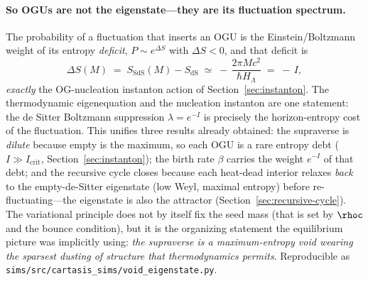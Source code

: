 \paragraph{So OGUs are not the eigenstate---they are its fluctuation spectrum.}
The probability of a fluctuation that inserts an OGU is the Einstein/Boltzmann weight
of its entropy \emph{deficit}, $P\sim e^{\Delta S}$ with $\Delta S<0$, and that deficit
is
\begin{equation}
  \Delta S(M) \;=\; S_{\mathrm{SdS}}(M) - S_{\mathrm{dS}}
  \;\simeq\; -\,\frac{2\pi M c^2}{\hbar H_\Lambda} \;=\; -\,I,
\end{equation}
\emph{exactly} the OG-nucleation instanton action of Section~\ref{sec:instanton}. The
thermodynamic eigenequation and the nucleation instanton are one statement: the de
Sitter Boltzmann suppression $\lambda=e^{-I}$ is precisely the horizon-entropy cost of
the fluctuation. This unifies three results already obtained: the supraverse is
\emph{dilute} because empty is the maximum, so each OGU is a rare entropy debt
($I\gg I_{\mathrm{crit}}$, Section~\ref{sec:instanton}); the birth rate $\beta$ carries
the weight $e^{-I}$ of that debt; and the recursive cycle closes because each
heat-dead interior relaxes \emph{back} to the empty-de-Sitter eigenstate (low Weyl,
maximal entropy) before re-fluctuating---the eigenstate is also the attractor
(Section~\ref{sec:recursive-cycle}). The variational principle does not by itself fix
the seed mass (that is set by $\rhoc$ and the bounce condition), but it is the
organizing statement the equilibrium picture was implicitly using: \emph{the
supraverse is a maximum-entropy void wearing the sparsest dusting of structure that
thermodynamics permits}. Reproducible as
\texttt{sims/src/cartasis\_sims/void\_eigenstate.py}.


